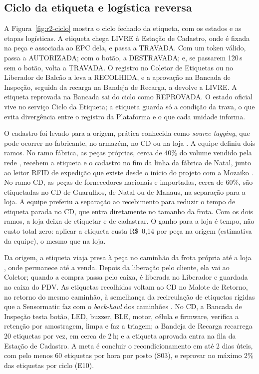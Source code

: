 \subsection{Ciclo da etiqueta e logística reversa}
\label{sub:r2-ciclo}

A Figura~\ref{fig:r2-ciclo} mostra o ciclo fechado da etiqueta, com os estados e as etapas logísticas. A etiqueta chega LIVRE à Estação de Cadastro, onde é fixada na peça e associada ao EPC dela, e passa a TRAVADA. Com um token válido, passa a AUTORIZADA; com o botão, a DESTRAVADA; e, se passarem 120\,s sem o botão, volta a TRAVADA. O registro no Coletor de Etiquetas ou no Liberador de Balcão a leva a RECOLHIDA, e a aprovação na Bancada de Inspeção, seguida da recarga na Bandeja de Recarga, a devolve a LIVRE. A etiqueta reprovada na Bancada sai do ciclo como REPROVADA. O estado oficial vive no serviço Ciclo da Etiqueta; a etiqueta guarda só a condição da trava, o que evita divergência entre o registro da Plataforma e o que cada unidade informa.

O cadastro foi levado para a origem, prática conhecida como \textit{source tagging}, que pode ocorrer no fabricante, no armazém, no CD ou na loja \cite{sensormatic2025sourcetagging}. A equipe definiu dois ramos. No ramo fábrica, as peças próprias, cerca de 40\% do volume vendido pela rede \cite{bloomberglinea2026riachuelo}, recebem a etiqueta e o cadastro no fim da linha da fábrica de Natal, junto ao leitor RFID de expedição que existe desde o início do projeto com a Mozaiko \cite{tiinside2022riachuelo}. No ramo CD, as peças de fornecedores nacionais e importadas, cerca de 60\%, são etiquetadas no CD de Guarulhos, de Natal ou de Manaus, na separação para a loja. A equipe preferiu a separação ao recebimento para reduzir o tempo de etiqueta parada no CD, que entra diretamente no tamanho da frota. Com os dois ramos, a loja deixa de etiquetar e de cadastrar. O ganho para a loja é tempo, não custo total zero: aplicar a etiqueta custa R\$~0,14 por peça na origem (estimativa da equipe), o mesmo que na loja.

Da origem, a etiqueta viaja presa à peça no caminhão da frota própria até a loja \cite{bloomberglinea2026riachuelo, folhape2023guararapes}, onde permanece até a venda. Depois da liberação pelo cliente, ela vai ao Coletor; quando a compra passa pelo caixa, é liberada no Liberador e guardada no caixa do PDV. As etiquetas recolhidas voltam ao CD no Malote de Retorno, no retorno do mesmo caminhão, à semelhança da recirculação de etiquetas rígidas que a Sensormatic faz com o \textit{back-haul} dos caminhões \cite{sensormatic2024recirculacao}. No CD, a Bancada de Inspeção testa botão, LED, buzzer, BLE, motor, célula e firmware, verifica a retenção por amostragem, limpa e faz a triagem; a Bandeja de Recarga recarrega 20 etiquetas por vez, em cerca de 2\,h; e a etiqueta aprovada entra na fila da Estação de Cadastro. A meta é concluir o recondicionamento em até 2 dias úteis, com pelo menos 60 etiquetas por hora por posto (S03), e reprovar no máximo 2\% das etiquetas por ciclo (E10).

